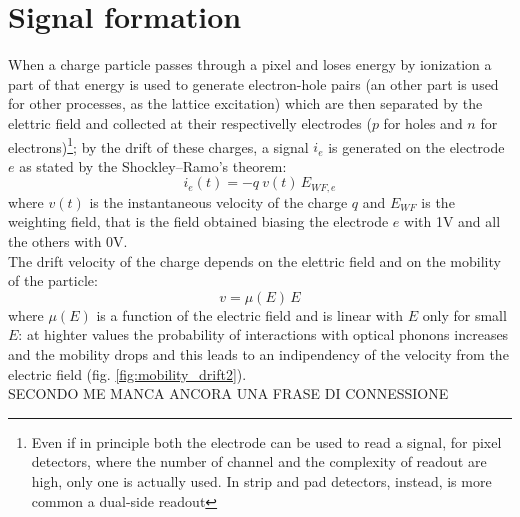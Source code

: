 \section{Signal formation}
    When a charge particle passes through a pixel and loses energy by ionization a part of that energy is used to generate electron-hole pairs (an other part is used for other processes, as the lattice excitation) which are then separated by the elettric field and collected at their respectivelly electrodes ($p$ for holes and $n$ for electrons)\footnote{Even if in principle both the electrode can be used to read a signal, for pixel detectors, where the number of channel and the complexity of readout are high, only one is actually used. In strip and pad detectors, instead, is more common a dual-side readout}; by the drift of these charges, a signal $i_e$ is generated on the  electrode $e$ as stated by the Shockley–Ramo's theorem: 
    \begin{equation}
        i_e(t) = -q\: v(t)\, E_{WF,e}
    \end{equation}
    where $v(t)$ is the instantaneous velocity of the charge $q$ and $E_{WF}$ is the weighting field, that is the field obtained biasing the electrode $e$ with 1V and all the others with 0V.\\
    The drift velocity of the charge depends on the elettric field and on the mobility of the particle:
    \begin{equation}
        v = \mu(E)\, E
    \end{equation}
    where $\mu(E)$ is a function of the electric field and is linear with $E$ only for small $E$: at highter values the probability of interactions with optical phonons increases and the mobility drops and this leads to an indipendency of the velocity from the electric field (fig. \ref{fig:mobility_drift2}).\\
    SECONDO ME MANCA ANCORA UNA FRASE DI CONNESSIONE\\
